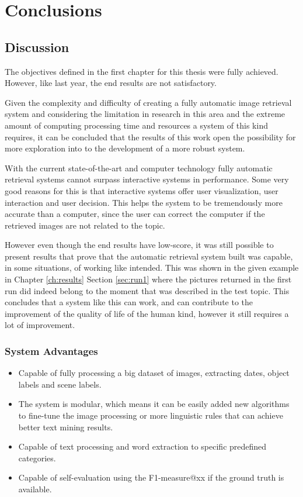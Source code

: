 \cleardoublepage
\chapter{Conclusions}
\label{ch:conclusions}


\section{Discussion}

The objectives defined in the first chapter for this thesis were fully achieved. However, like last year, the end results are not satisfactory.


Given the complexity and difficulty of creating a fully automatic image retrieval system and considering the limitation in research in this area and the extreme amount of computing processing time and resources a system of this kind requires, it can be concluded that the results of this work open the possibility for more exploration into to the development of a more robust system.


With the current state-of-the-art and computer technology fully automatic retrieval systems cannot surpass interactive systems in performance. Some very good reasons for this is that interactive systems offer user visualization, user interaction and user decision. This helps the system to be tremendously more accurate than a computer, since the user can correct the computer if the retrieved images are not related to the topic.


However even though the end results have low-score, it was still possible to present results that prove that the automatic retrieval system built was capable, in some situations, of working like intended. This was shown in the given example in Chapter \ref{ch:results} Section \ref{sec:run1} where the pictures returned in the first run did indeed belong to the moment that was described in the test topic. This concludes that a system like this can work, and can contribute to the improvement of the quality of life of the human kind, however it still requires a lot of improvement.



\subsection{System Advantages}

\begin{itemize}
    \itemsep0em
    \item Capable of fully processing a big dataset of images, extracting dates, object labels and scene labels.
    \item The system is modular, which means it can be easily added new algorithms to fine-tune the image processing or more linguistic rules that can achieve better text mining results.
    \item Capable of text processing and word extraction to specific predefined categories.
    \item Capable of self-evaluation using the F1-measure@xx if the ground truth is available.
\end{itemize}


